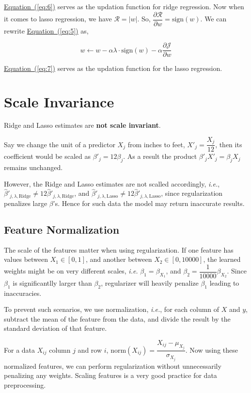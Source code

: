 \documentclass{scrartcl}
\renewcommand{\eqref}[1]{\hyperref[#1]{Equation~(\ref*{#1})}}
\begin{document}
	\eqref{eq:6} serves as the updation function for ridge regression. Now when it comes to lasso regression, we have \(\mathcal{R}=|w|\). So, \(\dfrac{\partial \mathcal{R}}{\partial w}=\text{sign}(w)\). We can rewrite \eqref{eq:5} as,
	
	\begin{equation}\label{eq:7}
		w\leftarrow w-\alpha\lambda\cdot\text{sign}(w)-\alpha\frac{\partial\mathcal{J}}{\partial w}
	\end{equation}
	
	\eqref{eq:7} serves as the updation function for the lasso regression.
	
	\section{Scale Invariance}
	
	Ridge and Lasso estimates are \textbf{not scale invariant}.
	
	Say we change the unit of a predictor \(X_j\) from inches to feet, \(X'_j=\dfrac{X_j}{12}\), then its coefficient would be scaled as \(\beta'_j=12\beta_j\). As a result the product \(\beta'_jX'_j=\beta_jX_j\) remains unchanged.
	
	However, the Ridge and Lasso estimates are not scalled accordingly, \textit{i.e.}, \(\hat{\beta}'_{j,\lambda,\text{Ridge}}\ne12\hat{\beta}'_{j,\lambda,\text{Ridge}}\), and \(\hat{\beta}'_{j,\lambda,\text{Lasso}}\ne12\hat{\beta}'_{j,\lambda,\text{Lasso}}\), since regularization penalizes large \(\beta\)'s. Hence for such data the model may return inaccurate results.
	
	\subsection{Feature Normalization}
	
	The scale of the features matter when using regularization. If one feature has values between \(X_1\in[0,1]\), and another between \(X_2\in[0,10000]\), the learned weights might be on very different scales, \textit{i.e.} \(\beta_1=\beta_{X_1}\), and \(\beta_2=\dfrac{1}{10000}\beta_{X_2}\). Since \(\beta_1\) is significantlly larger than \(\beta_2\), regularizer will heavily penalize \(\beta_1\) leading to inaccuracies.
	
	To prevent such scenarios, we use normalization, \textit{i.e.}, for each column of \(X\) and \(y\), subtract the mean of the feature from the data, and divide the result by the standard deviation of that feature.
	
	For a data \(X_{ij}\) column \(j\) and row \(i\), \(\text{norm}(X_{ij})=\dfrac{X_{ij}-\mu_{X_j}}{\sigma_{X_j}}\). Now using these normalized features, we can perform regularization without unnecessarily penalizing any weights. Scaling features is a very good practice for data preprocessing.
	
\end{document}
